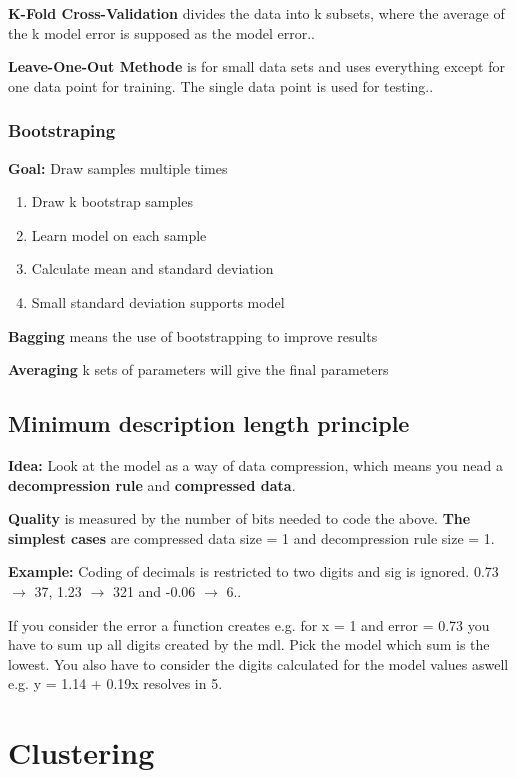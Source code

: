 \documentclass[fleqn, oneside, 10pt, titlepage]{article}
\begin{document}
\textbf{K-Fold Cross-Validation} divides the data into k subsets, where the average of the k model error is supposed as the model error..

\textbf{Leave-One-Out Methode} is for small data sets and uses everything except for one data point for training. The single data point is used for testing..

\subsubsection{Bootstraping}
\textbf{Goal:} Draw samples multiple times

\begin{enumerate}
	\item Draw k bootstrap samples
	\item Learn model on each sample
	\item Calculate mean and standard deviation
	\item Small standard deviation supports model
\end{enumerate}

\textbf{Bagging} means the use of bootstrapping to improve results

\textbf{Averaging} k sets of parameters will give the final parameters

\subsection{Minimum description length principle}
\textbf{Idea:} Look at the model as a way of data compression, which means you nead a \textbf{decompression rule} and \textbf{compressed data}.

\textbf{Quality} is measured by the number of bits needed to code the above. \textbf{The simplest cases} are compressed data size = 1 and decompression rule size = 1.

\textbf{Example:} Coding of decimals is restricted to two digits and sig is ignored. 0.73 $\rightarrow$ 37, 1.23 $\rightarrow$ 321 and -0.06 $\rightarrow$ 6..

If you consider the error a function creates e.g. for x = 1 and error = 0.73 you have to sum up all digits created by the mdl. Pick the model which sum is the lowest. You also have to consider the digits calculated for the model values aswell e.g. y = 1.14 + 0.19x resolves in 5.

\section{Clustering}
\end{document}
